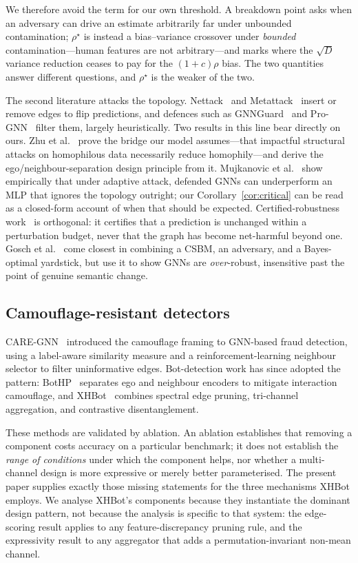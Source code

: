 \documentclass[../elsevier.tex]{subfiles}
\begin{document}
We therefore avoid the term for our own threshold. A breakdown point asks when an
adversary can drive an estimate arbitrarily far under unbounded contamination;
$\rho^\star$ is instead a bias--variance crossover under \emph{bounded}
contamination---human features are not arbitrary---and marks where the $\sqrt{D}$
variance reduction ceases to pay for the $(1+c)\rho$ bias. The two quantities answer
different questions, and $\rho^\star$ is the weaker of the two.

The second literature attacks the topology. Nettack~\citep{zugner2018adversarial} and
Metattack~\citep{zugner2019adversarial} insert or remove edges to flip predictions,
and defences such as GNNGuard~\citep{zhang2020gnnguard} and
Pro-GNN~\citep{jin2020graph} filter them, largely heuristically. Two results in this
line bear directly on ours. Zhu et al.~\citeyearpar{zhu2022how} prove the bridge our model
assumes---that impactful structural attacks on homophilous data necessarily reduce
homophily---and derive the ego/neighbour-separation design principle from it.
Mujkanovic et al.~\citeyearpar{mujkanovic2022are} show empirically that under adaptive
attack, defended GNNs can underperform an MLP that ignores the topology outright;
our Corollary~\ref{cor:critical} can be read as a closed-form account of when that
should be expected. Certified-robustness work~\citep{bojchevski2019certifiable} is
orthogonal: it certifies that a prediction is unchanged within a perturbation
budget, never that the graph has become net-harmful beyond one. Gosch
et al.~\citeyearpar{gosch2023revisiting} come closest in combining a CSBM, an adversary,
and a Bayes-optimal yardstick, but use it to show GNNs are \emph{over}-robust,
insensitive past the point of genuine semantic change.

\subsection{Camouflage-resistant detectors}

CARE-GNN~\citep{dou2020caregnn} introduced the camouflage framing to GNN-based fraud
detection, using a label-aware similarity measure and a reinforcement-learning
neighbour selector to filter uninformative edges. Bot-detection work has since
adopted the pattern: BotHP~\citep{he2025bothp} separates ego and neighbour encoders
to mitigate interaction camouflage, and XHBot~\citep{dang2026xhbot} combines
spectral edge pruning, tri-channel aggregation, and contrastive disentanglement.

These methods are validated by ablation. An ablation establishes that removing a
component costs accuracy on a particular benchmark; it does not establish the
\emph{range of conditions} under which the component helps, nor whether a
multi-channel design is more expressive or merely better parameterised. The present
paper supplies exactly those missing statements for the three mechanisms XHBot
employs. We analyse XHBot's components because they instantiate the dominant design
pattern, not because the analysis is specific to that system: the edge-scoring
result applies to any feature-discrepancy pruning rule, and the expressivity result
to any aggregator that adds a permutation-invariant non-mean channel.
\end{document}
